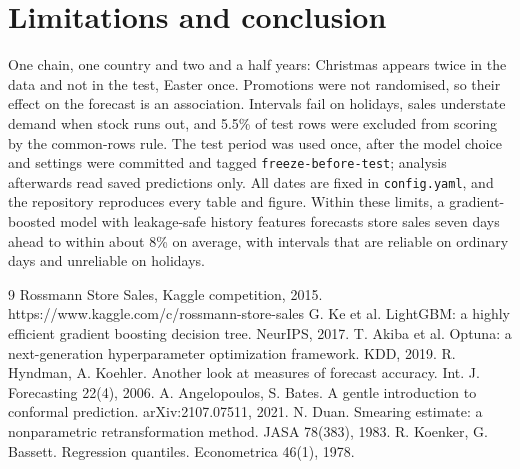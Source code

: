 \documentclass[10pt,twocolumn]{extarticle}
\begin{document}
\section{Limitations and conclusion}
One chain, one country and two and a half years: Christmas appears twice in the data and not in the test, Easter once. Promotions were not randomised, so their effect on the forecast is an association. Intervals fail on holidays, sales understate demand when stock runs out, and 5.5\% of test rows were excluded from scoring by the common-rows rule. The test period was used once, after the model choice and settings were committed and tagged \texttt{freeze-before-test}; analysis afterwards read saved predictions only. All dates are fixed in \texttt{config.yaml}, and the repository reproduces every table and figure. Within these limits, a gradient-boosted model with leakage-safe history features forecasts store sales seven days ahead to within about 8\% on average, with intervals that are reliable on ordinary days and unreliable on holidays.

\begin{thebibliography}{9}\footnotesize\setlength{\itemsep}{0pt}\setlength{\parskip}{0pt}
 Rossmann Store Sales, Kaggle competition, 2015. https://www.kaggle.com/c/rossmann-store-sales
 G. Ke et al. LightGBM: a highly efficient gradient boosting decision tree. NeurIPS, 2017.
 T. Akiba et al. Optuna: a next-generation hyperparameter optimization framework. KDD, 2019.
 R. Hyndman, A. Koehler. Another look at measures of forecast accuracy. Int. J. Forecasting 22(4), 2006.
 A. Angelopoulos, S. Bates. A gentle introduction to conformal prediction. arXiv:2107.07511, 2021.
 N. Duan. Smearing estimate: a nonparametric retransformation method. JASA 78(383), 1983.
 R. Koenker, G. Bassett. Regression quantiles. Econometrica 46(1), 1978.
\end{thebibliography}
\end{document}
